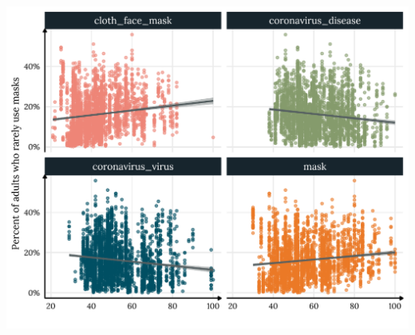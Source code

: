 \documentclass[
]{article}
\begin{document}
\begin{center}\includegraphics[width=0.8\linewidth]{paper1_files/figure-latex/mask_plot-1} \end{center}
\end{document}
